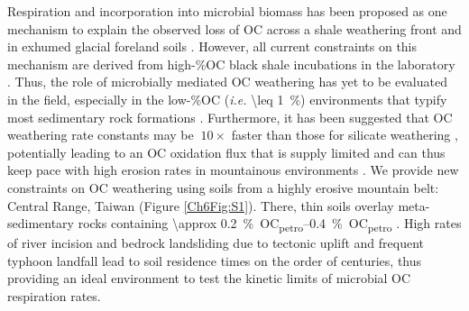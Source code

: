 Respiration and incorporation into microbial biomass has been proposed as one mechanism to explain the observed loss of OC across a shale weathering front \citep{Petsch:2001eq,Petsch:2005gd,Schillawski:2008ko,Petsch:2014ct} and in exhumed glacial foreland soils \citep{Bardgett:2007eb}. However, all current constraints on this mechanism are derived from high-\%OC black shale incubations in the laboratory \citep{Petsch:2001eq,Schillawski:2008ko}. Thus, the role of microbially mediated OC weathering has yet to be evaluated in the field, especially in the low-\%OC (\textit{i.e.} \SI{\leq 1}{\%}) environments that typify most sedimentary rock formations \citep{Copard:2007bf}. Furthermore, it has been suggested that OC weathering rate constants may be $~10\times$ faster than those for silicate weathering \citep{Chang:1999vo}, potentially leading to an OC oxidation flux that is supply limited and can thus keep pace with high erosion rates in mountainous environments \citep{Hilton:2014dh}. We provide new constraints on OC weathering using soils from a highly erosive mountain belt: Central Range, Taiwan (Figure \ref{Ch6Fig:S1}). There, thin soils \citep[\SI{\leq 0.8}{m};][]{Tsai:2001vp} overlay meta-sedimentary rocks containing \SIrange{\approx 0.2}{0.4}{\%OC_{petro}} \citep[Supplementary Discussion \ref{Ch6SD1};][]{Hilton:2010cg}. High rates of river incision and bedrock landsliding due to tectonic uplift and frequent typhoon landfall lead to soil residence times on the order of centuries, thus providing an ideal environment to test the kinetic limits of microbial OC respiration rates.

